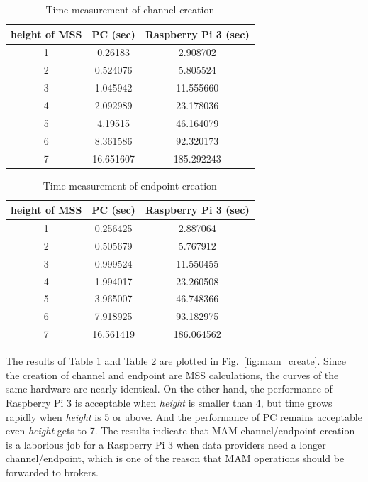 \documentclass[conference]{IEEEtran}
\begin{document}
\begin{table}[htbp]
    \caption{Time measurement of channel creation}
    \label{tab:channel_create}
    \begin{center}
    \begin{tabular}{|c|c|c|}
    \hline
        \textbf{height of MSS} & \textbf{PC (sec)} & \textbf{Raspberry Pi 3 (sec)} \\
        \hline
        1 & 0.26183 & 2.908702 \\
        2 & 0.524076 & 5.805524 \\
        3 & 1.045942 & 11.555660 \\
        4 & 2.092989 & 23.178036 \\
        5 & 4.19515 & 46.164079\\
        6 & 8.361586 & 92.320173\\
        7 & 16.651607 & 185.292243\\
        \hline
    \end{tabular}
    \end{center}
\end{table}

\begin{table}[htbp]
    \caption{Time measurement of endpoint creation}
    \label{tab:endpoint_create}
    \begin{center}
    \begin{tabular}{|c|c|c|}
    \hline
        \textbf{height of MSS} & \textbf{PC (sec)} & \textbf{Raspberry Pi 3 (sec)} \\
        \hline
        1 & 0.256425 & 2.887064 \\
        2 & 0.505679 & 5.767912 \\
        3 & 0.999524 & 11.550455 \\
        4 & 1.994017 & 23.260508 \\
        5 & 3.965007 & 46.748366 \\
        6 & 7.918925 & 93.182975 \\
        7 & 16.561419 & 186.064562 \\
        \hline
    \end{tabular}
    \end{center}
\end{table}

The results of Table \ref{tab:channel_create} and Table \ref{tab:endpoint_create} are plotted in Fig.~\ref{fig:mam_create}. Since the creation of channel and endpoint are MSS calculations, the curves of the same hardware are nearly identical. On the other hand, the performance of Raspberry Pi 3 is acceptable when \textit{height} is smaller than 4, but time grows rapidly when \textit{height} is 5 or above. And the performance of PC remains acceptable even \textit{height} gets to 7. The results indicate that MAM channel/endpoint creation is a laborious job for a Raspberry Pi 3 when data providers need a longer channel/endpoint, which is one of the reason that MAM operations should be forwarded to brokers.
 
\end{document}
